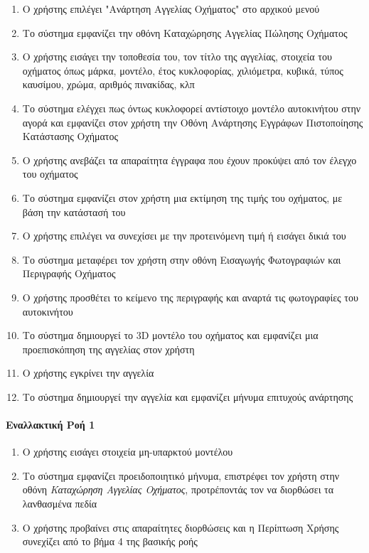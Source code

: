 \documentclass{../ol-softwaremanual}
\begin{document}
	\begin{enumerate}
		
		\item Ο χρήστης επιλέγει \en"\gr Ανάρτηση Αγγελίας Οχήματος\en" \gr στο αρχικού μενού
		\item Το σύστημα εμφανίζει την οθόνη Καταχώρησης Αγγελίας Πώλησης Οχήματος
		\item Ο χρήστης εισάγει την τοποθεσία του, τον τίτλο της αγγελίας, στοιχεία του οχήματος όπως μάρκα, μοντέλο, έτος κυκλοφορίας, χιλιόμετρα, κυβικά, τύπος καυσίμου, χρώμα, αριθμός πινακίδας, κλπ
		\item Το σύστημα ελέγχει πως όντως κυκλοφορεί αντίστοιχο μοντέλο αυτοκινήτου στην αγορά και εμφανίζει στον χρήστη την Οθόνη Ανάρτησης Εγγράφων Πιστοποίησης Κατάστασης Οχήματος
		\item Ο χρήστης ανεβάζει τα απαραίτητα έγγραφα που έχουν προκύψει από τον έλεγχο του οχήματος		
		\item Το σύστημα εμφανίζει στον χρήστη μια εκτίμηση της τιμής του οχήματος, με βάση την κατάστασή του
		\item Ο χρήστης επιλέγει να συνεχίσει με την προτεινόμενη τιμή ή εισάγει δικιά του
		\item Το σύστημα μεταφέρει τον χρήστη στην οθόνη Εισαγωγής Φωτογραφιών και Περιγραφής Οχήματος
		\item Ο χρήστης προσθέτει το κείμενο της περιγραφής και αναρτά τις φωτογραφίες του αυτοκινήτου
		\item Το σύστημα δημιουργεί το \en 3D \gr μοντέλο του οχήματος και εμφανίζει μια προεπισκόπηση της αγγελίας στον χρήστη
		\item Ο χρήστης εγκρίνει την αγγελία
		\item Το σύστημα δημιουργεί την αγγελία και εμφανίζει μήνυμα επιτυχούς ανάρτησης
	\end{enumerate}
	
	\paragraph{Εναλλακτική Ροή 1}
	
	\begin{enumerate}
		\item O χρήστης εισάγει στοιχεία μη-υπαρκτού μοντέλου
		\item Το σύστημα εμφανίζει προειδοποιητικό μήνυμα, επιστρέφει τον χρήστη στην οθόνη \textit{Καταχώρηση Αγγελίας Οχήματος}, προτρέποντάς τον να διορθώσει τα λανθασμένα πεδία
		\item Ο χρήστης προβαίνει στις απαραίτητες διορθώσεις και η Περίπτωση Χρήσης συνεχίζει από το βήμα 4 της βασικής ροής
	\end{enumerate}
	
\end{document}
